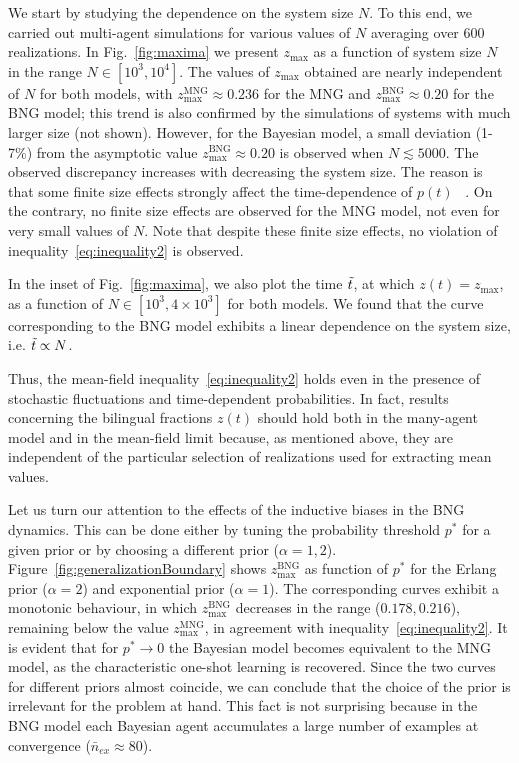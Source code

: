 \documentclass[review]{elsarticle}
\newcommand{\zmax}{z_\mathrm{max}}
\newcommand{\Tt}{\Tilde{t}}
\newcommand{\+}{\! + \!}
\begin{document}
We start by studying the dependence on the system size $N$. 
To this end, we carried out multi-agent simulations for various values of $N$ averaging over $600$ realizations.
In Fig.~\ref{fig:maxima} we present $\zmax$ as a function of system size $N$ in the range $N \in [10^3, 10^4]$. 
The values of $\zmax$ obtained are nearly independent of $N$ for both models, with $\zmax^\mathrm{MNG}  \approx 0.236$ for the MNG and $\zmax^\mathrm{BNG}  \approx 0.20$ for the BNG model; this trend is also confirmed by the simulations of systems with much larger size (not shown).
However, for the Bayesian model, a small deviation (1-7\%) from the asymptotic value $\zmax^\mathrm{BNG} \approx 0.20$ is observed when $N \lesssim 5000$. 
The observed discrepancy increases with decreasing the system size. The reason is that  some finite size effects strongly affect the time-dependence of  $p(t)$ ~\cite{Toral2007a, Brigatti-2016a}.
On the contrary,  no finite size effects are observed for the MNG model, not even for very small values of $N$. Note that despite these finite size effects, no violation of inequality~\eqref{eq:inequality2} is observed.


In the inset of  Fig.~\ref{fig:maxima}, we also plot the  time $\Tt$,  at which $z(t) = \zmax$, as a function of $N \in [10^3, 4 \times 10^3]$ for both models. 
We found that the curve corresponding to the BNG model exhibits a linear dependence on the system size, i.e. $\Tt \propto N$.


Thus, the mean-field inequality~\eqref{eq:inequality2} holds even in the presence of  stochastic fluctuations and time-dependent probabilities.
In fact, results concerning the bilingual fractions $z(t)$ should hold both in the many-agent model and in the mean-field limit because, as mentioned above, they are independent of the particular selection of realizations used for extracting mean values.


Let us turn our attention to the effects of the inductive biases in the BNG dynamics. 
This can be done either by tuning the probability threshold  $ p^*$ for a given prior or by choosing a different prior ($\alpha=1,2$). 
Figure~\ref{fig:generalizationBoundary} shows $\zmax^\mathrm{BNG}$ as function of $p^*$ for the Erlang prior ($\alpha=2$) and exponential prior ($\alpha=1$). 
The corresponding curves exhibit a monotonic behaviour, in which $\zmax^\mathrm{BNG}$ decreases in the range ($0.178, 0.216$), remaining below the value $\zmax^\mathrm{MNG}$, in agreement with inequality~\eqref{eq:inequality2}.
It is evident that for $p^* \rightarrow  0$ the Bayesian model becomes equivalent to the MNG model, as the characteristic one-shot learning is recovered. 
Since the two curves for different priors almost coincide, we can conclude that the choice of the prior is irrelevant for the problem at hand. 
This fact is not surprising because in the BNG model each Bayesian agent accumulates a large number of examples at convergence ($\bar{n}_{ex} \approx 80$). 
\end{document}
